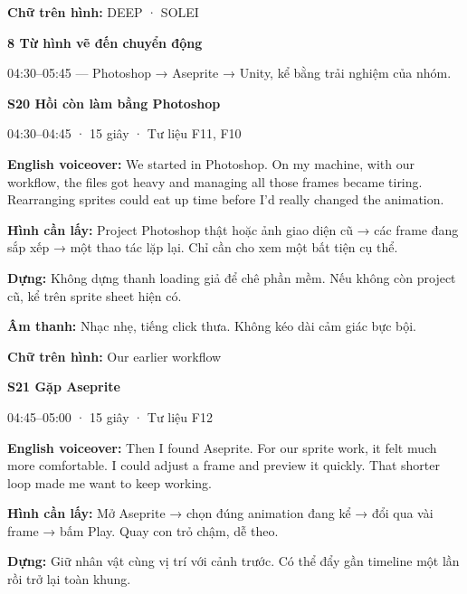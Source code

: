 \documentclass[10pt,a4paper]{article}
\begin{document}
\textbf{Chữ trên hình:}  DEEP · SOLEI\par

\clearpage

\textbf{8 Từ hình vẽ đến chuyển động}\par

04:30–05:45 — Photoshop → Aseprite → Unity, kể bằng trải nghiệm của nhóm.\par

\textbf{S20 Hồi còn làm bằng Photoshop}\par

04:30–04:45 · 15 giây · Tư liệu F11, F10\par

\textbf{English voiceover:}  We started in Photoshop. On my machine, with our workflow, the files got heavy and managing all those frames became tiring. Rearranging sprites could eat up time before I’d really changed the animation.\par

\textbf{Hình cần lấy:}  Project Photoshop thật hoặc ảnh giao diện cũ → các frame đang sắp xếp → một thao tác lặp lại. Chỉ cần cho xem một bất tiện cụ thể.\par

\textbf{Dựng:}  Không dựng thanh loading giả để chê phần mềm. Nếu không còn project cũ, kể trên sprite sheet hiện có.\par

\textbf{Âm thanh:}  Nhạc nhẹ, tiếng click thưa. Không kéo dài cảm giác bực bội.\par

\textbf{Chữ trên hình:}  Our earlier workflow\par

\textbf{S21 Gặp Aseprite}\par

04:45–05:00 · 15 giây · Tư liệu F12\par

\textbf{English voiceover:}  Then I found Aseprite. For our sprite work, it felt much more comfortable. I could adjust a frame and preview it quickly. That shorter loop made me want to keep working.\par

\textbf{Hình cần lấy:}  Mở Aseprite → chọn đúng animation đang kể → đổi qua vài frame → bấm Play. Quay con trỏ chậm, dễ theo.\par

\textbf{Dựng:}  Giữ nhân vật cùng vị trí với cảnh trước. Có thể đẩy gần timeline một lần rồi trở lại toàn khung.\par
\end{document}
